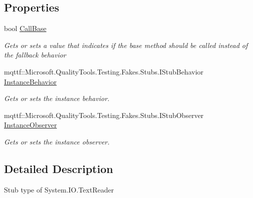 \subsection*{Properties}
\begin{DoxyCompactItemize}
\item 
bool \hyperlink{class_system_1_1_i_o_1_1_fakes_1_1_stub_text_reader_accfcfea0f1e98e564d13404ef21d50f0}{Call\-Base}
\begin{DoxyCompactList}\small\item\em Gets or sets a value that indicates if the base method should be called instead of the fallback behavior\end{DoxyCompactList}\item 
mqttf\-::\-Microsoft.\-Quality\-Tools.\-Testing.\-Fakes.\-Stubs.\-I\-Stub\-Behavior \hyperlink{class_system_1_1_i_o_1_1_fakes_1_1_stub_text_reader_a263f84a058cffec09fd2eb1a29a83eb5}{Instance\-Behavior}
\begin{DoxyCompactList}\small\item\em Gets or sets the instance behavior.\end{DoxyCompactList}\item 
mqttf\-::\-Microsoft.\-Quality\-Tools.\-Testing.\-Fakes.\-Stubs.\-I\-Stub\-Observer \hyperlink{class_system_1_1_i_o_1_1_fakes_1_1_stub_text_reader_a73884c57e732fd8cae4dee31ee0567d8}{Instance\-Observer}
\begin{DoxyCompactList}\small\item\em Gets or sets the instance observer.\end{DoxyCompactList}\end{DoxyCompactItemize}


\subsection{Detailed Description}
Stub type of System.\-I\-O.\-Text\-Reader



